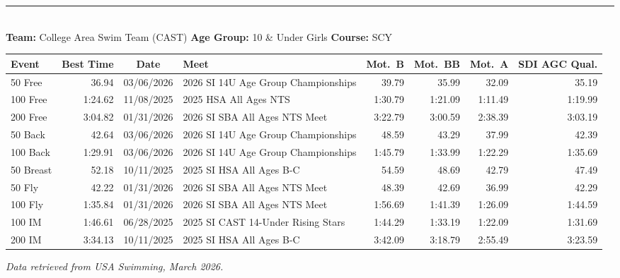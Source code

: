 \documentclass[11pt]{article}
\begin{document}
\bigskip
\noindent\rule{\textwidth}{0.4pt}
\medskip

\\[3pt]
\textbf{Team:} College Area Swim Team (CAST)\quad
\textbf{Age Group:} 10 \& Under Girls\quad
\textbf{Course:} SCY

\smallskip

\noindent\begin{tabular}{lrcp{2.9in}rrrr}
\toprule
\textbf{Event} & \textbf{Best Time} & \textbf{Date} & \textbf{Meet} &
\textbf{Mot.\ B} & \textbf{Mot.\ BB} & \textbf{Mot.\ A} & \textbf{SDI AGC Qual.}\\
\midrule
50 Free     & 36.94   & 03/06/2026 & 2026 SI 14U Age Group Championships    & 39.79   & 35.99   & 32.09   & 35.19   \\
100 Free    & 1:24.62 & 11/08/2025 & 2025 HSA All Ages NTS                  & 1:30.79 & 1:21.09 & 1:11.49 & 1:19.99 \\
200 Free    & 3:04.82 & 01/31/2026 & 2026 SI SBA All Ages NTS Meet          & 3:22.79 & 3:00.59 & 2:38.39 & 3:03.19 \\
50 Back     & 42.64   & 03/06/2026 & 2026 SI 14U Age Group Championships    & 48.59   & 43.29   & 37.99   & 42.39   \\
100 Back    & 1:29.91 & 03/06/2026 & 2026 SI 14U Age Group Championships    & 1:45.79 & 1:33.99 & 1:22.29 & 1:35.69 \\
50 Breast   & 52.18   & 10/11/2025 & 2025 SI HSA All Ages B-C               & 54.59   & 48.69   & 42.79   & 47.49   \\
50 Fly      & 42.22   & 01/31/2026 & 2026 SI SBA All Ages NTS Meet          & 48.39   & 42.69   & 36.99   & 42.29   \\
100 Fly     & 1:35.84 & 01/31/2026 & 2026 SI SBA All Ages NTS Meet          & 1:56.69 & 1:41.39 & 1:26.09 & 1:44.59 \\
100 IM      & 1:46.61 & 06/28/2025 & 2025 SI CAST 14-Under Rising Stars     & 1:44.29 & 1:33.19 & 1:22.09 & 1:31.69 \\
200 IM      & 3:34.13 & 10/11/2025 & 2025 SI HSA All Ages B-C               & 3:42.09 & 3:18.79 & 2:55.49 & 3:23.59 \\
\bottomrule
\end{tabular}

\bigskip\bigskip

\begin{center}
  \footnotesize\itshape Data retrieved from USA Swimming, March 2026.
\end{center}
\end{document}
